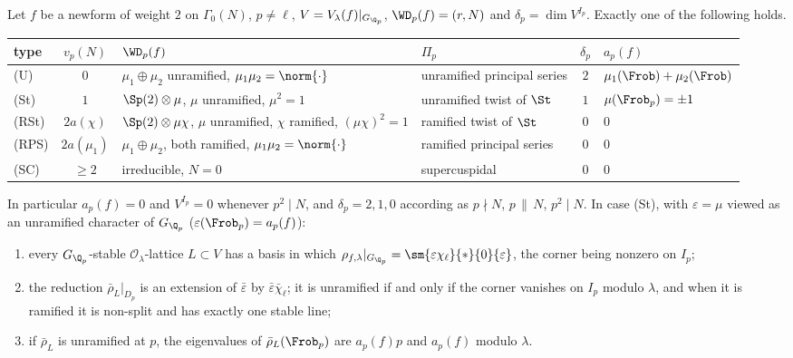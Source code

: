 \begin{theorem}\label{thm:modgalrep:local-types}
Let $f$ be a newform of weight $2$ on $\Gamma_0(N)$, $p\ne\ell$, $V=V_\lambda(f)|_{G_{\Q_p}}$, $\WD_p(f)=(r,N)$ and $\delta_p=\dim V^{I_p}$. Exactly one of the following holds.
\begin{center}\small
\begin{tabular}{@{}lcp{4.4cm}p{2.5cm}cp{2.1cm}@{}}
\toprule
type & $v_p(N)$ & $\WD_p(f)$ & $\Pi_p$ & $\delta_p$ & $a_p(f)$\\
\midrule
(U) & $0$ & $\mu_1\oplus\mu_2$ unramified, $\mu_1\mu_2=\norm{\cdot}$ & unramified principal series & $2$ & $\mu_1(\Frob)+\mu_2(\Frob)$\\
(St) & $1$ & $\Sp(2)\otimes\mu$, $\mu$ unramified, $\mu^2=1$ & unramified twist of $\St$ & $1$ & $\mu(\Frob_p)=\pm1$\\
(RSt) & $2a(\chi)$ & $\Sp(2)\otimes\mu\chi$, $\mu$ unramified, $\chi$ ramified, $(\mu\chi)^2=1$ & ramified twist of $\St$ & $0$ & $0$\\
(RPS) & $2a(\mu_1)$ & $\mu_1\oplus\mu_2$, both ramified, $\mu_1\mu_2=\norm{\cdot}$ & ramified principal series & $0$ & $0$\\
(SC) & $\ge2$ & irreducible, $N=0$ & supercuspidal & $0$ & $0$\\
\bottomrule
\end{tabular}
\end{center}
In particular $a_p(f)=0$ and $V^{I_p}=0$ whenever $p^2\mid N$, and $\delta_p=2,1,0$ according as $p\nmid N$, $p\,\|\,N$, $p^2\mid N$. In case (St), with $\varepsilon=\mu$ viewed as an
unramified character of $G_{\Q_p}$ ($\varepsilon(\Frob_p)=a_p(f)$):
\begin{enumerate}[label=(\alph*)]
\item every $G_{\Q_p}$-stable $\mathcal{O}_\lambda$-lattice $L\subset V$ has a basis in which $\rho_{f,\lambda}|_{G_{\Q_p}}=\sm{\varepsilon\chi_\ell}{*}{0}{\varepsilon}$, the corner being nonzero on $I_p$;
\item the reduction $\bar\rho_L|_{D_p}$ is an extension of $\bar\varepsilon$ by $\bar\varepsilon\bar\chi_\ell$; it is unramified if and only if the corner vanishes on $I_p$ modulo $\lambda$,
and when it is ramified it is non-split and has exactly one stable line;
\item if $\bar\rho_L$ is unramified at $p$, the eigenvalues of $\bar\rho_L(\Frob_p)$ are $a_p(f)p$ and $a_p(f)$ modulo $\lambda$.
\end{enumerate}
\end{theorem}

